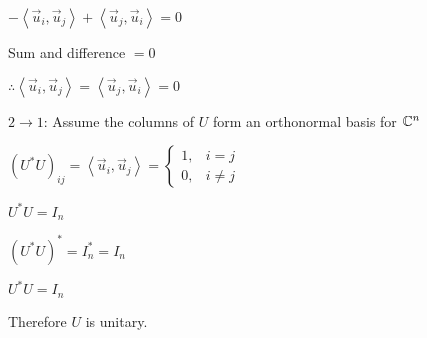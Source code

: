 \documentclass[letterpaper,12pt,fleqn]{article}
\newcommand{\inner}[2]{\left<#1,#2\right>}
\newcommand{\vu}{\vec{u}}
\begin{document}
\begin{theproof}
\begin{description}
    $-\inner{\vu_i}{\vu_j}+\inner{\vu_j}{\vu_i}=0$

    Sum and difference $=0$

    $\therefore\inner{\vu_i}{\vu_j}=\inner{\vu_j}{\vu_i}=0$

  \item $2\to 1$: Assume the columns of $U$ form an orthonormal basis for
    $\mathbb{C}^n$

    $(U^*U)_{ij}=\inner{\vu_i}{\vu_j}=
    \begin{cases} 1, & i=j \\ 0, & i\ne j \end{cases}$

    $U^*U=I_n$

    $(U^*U)^*=I_n^*=I_n$

    $U^*U=I_n$

    Therefore $U$ is unitary.
    
  \end{description}
\end{theproof}
\end{document}

